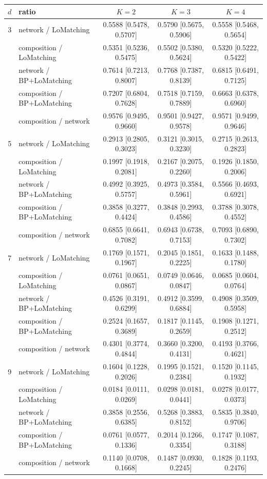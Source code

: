 \begin{tabular}{@{}clccc@{}}
\toprule
$d$ & ratio & $K=2$ & $K=3$ & $K=4$ \\
\midrule
3 & network / LoMatching & 0.5588 [0.5478, 0.5707] & 0.5790 [0.5675, 0.5906] & 0.5558 [0.5468, 0.5654] \\
 & composition / LoMatching & 0.5351 [0.5236, 0.5475] & 0.5502 [0.5380, 0.5624] & 0.5320 [0.5222, 0.5422] \\
 & network / BP+LoMatching & 0.7614 [0.7213, 0.8007] & 0.7768 [0.7387, 0.8139] & 0.6815 [0.6491, 0.7125] \\
 & composition / BP+LoMatching & 0.7207 [0.6804, 0.7628] & 0.7518 [0.7159, 0.7889] & 0.6663 [0.6378, 0.6960] \\
 & composition / network & 0.9576 [0.9495, 0.9660] & 0.9501 [0.9427, 0.9578] & 0.9571 [0.9499, 0.9646] \\
\midrule
5 & network / LoMatching & 0.2913 [0.2805, 0.3023] & 0.3121 [0.3015, 0.3230] & 0.2715 [0.2613, 0.2823] \\
 & composition / LoMatching & 0.1997 [0.1918, 0.2081] & 0.2167 [0.2075, 0.2260] & 0.1926 [0.1850, 0.2006] \\
 & network / BP+LoMatching & 0.4992 [0.3925, 0.5757] & 0.4973 [0.3584, 0.5961] & 0.5566 [0.4693, 0.6921] \\
 & composition / BP+LoMatching & 0.3858 [0.3277, 0.4424] & 0.3848 [0.2993, 0.4586] & 0.3788 [0.3078, 0.4552] \\
 & composition / network & 0.6855 [0.6641, 0.7082] & 0.6943 [0.6738, 0.7153] & 0.7093 [0.6890, 0.7302] \\
\midrule
7 & network / LoMatching & 0.1769 [0.1571, 0.1967] & 0.2045 [0.1851, 0.2225] & 0.1633 [0.1488, 0.1780] \\
 & composition / LoMatching & 0.0761 [0.0651, 0.0867] & 0.0749 [0.0646, 0.0847] & 0.0685 [0.0604, 0.0764] \\
 & network / BP+LoMatching & 0.4526 [0.3191, 0.6299] & 0.4912 [0.3599, 0.6884] & 0.4908 [0.3509, 0.5958] \\
 & composition / BP+LoMatching & 0.2524 [0.1657, 0.3689] & 0.1817 [0.1145, 0.2659] & 0.1908 [0.1271, 0.2512] \\
 & composition / network & 0.4301 [0.3774, 0.4844] & 0.3660 [0.3200, 0.4131] & 0.4193 [0.3766, 0.4621] \\
\midrule
9 & network / LoMatching & 0.1604 [0.1228, 0.2026] & 0.1995 [0.1521, 0.2384] & 0.1520 [0.1145, 0.1932] \\
 & composition / LoMatching & 0.0184 [0.0111, 0.0269] & 0.0298 [0.0181, 0.0441] & 0.0278 [0.0177, 0.0373] \\
 & network / BP+LoMatching & 0.3858 [0.2556, 0.6385] & 0.5268 [0.3883, 0.8152] & 0.5835 [0.3840, 0.9706] \\
 & composition / BP+LoMatching & 0.0761 [0.0577, 0.1336] & 0.2014 [0.1266, 0.3354] & 0.1747 [0.1087, 0.3188] \\
 & composition / network & 0.1140 [0.0708, 0.1668] & 0.1487 [0.0930, 0.2245] & 0.1828 [0.1193, 0.2476] \\
\bottomrule
\end{tabular}
